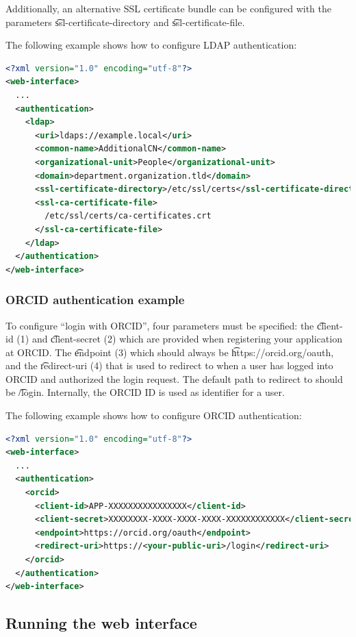   \begin{sloppypar}
  Additionally, an alternative SSL certificate bundle can be configured with
  the parameters \t{ssl-certificate-directory} and
  \t{ssl-certificate-file}.
  \end{sloppypar}

  The following example shows how to configure LDAP authentication:

\begin{lstlisting}[language=XML]
<?xml version="1.0" encoding="utf-8"?>
<web-interface>
  ...
  <authentication>
    <ldap>
      <uri>ldaps://example.local</uri>
      <common-name>AdditionalCN</common-name>
      <organizational-unit>People</organizational-unit>
      <domain>department.organization.tld</domain>
      <ssl-certificate-directory>/etc/ssl/certs</ssl-certificate-directory>
      <ssl-ca-certificate-file>
        /etc/ssl/certs/ca-certificates.crt
      </ssl-ca-certificate-file>
    </ldap>
  </authentication>
</web-interface>
\end{lstlisting}

\subsubsection{ORCID authentication example}

  To configure ``login with ORCID'', four parameters must be specified:
  the \t{client-id} (1) and \t{client-secret} (2) which are provided
  when registering your application at ORCID.  The \t{endpoint} (3) which
  should always be \t{https://orcid.org/oauth}, and the \t{redirect-uri}
  (4) that is used to redirect to when a user has logged into ORCID and
  authorized the login request.  The default path to redirect to should
  be \t{/login}.  Internally, the ORCID ID is used as identifier for a user.

  The following example shows how to configure ORCID authentication:

\begin{lstlisting}[language=XML]
<?xml version="1.0" encoding="utf-8"?>
<web-interface>
  ...
  <authentication>
    <orcid>
      <client-id>APP-XXXXXXXXXXXXXXXX</client-id>
      <client-secret>XXXXXXXX-XXXX-XXXX-XXXX-XXXXXXXXXXXX</client-secret>
      <endpoint>https://orcid.org/oauth</endpoint>
      <redirect-uri>https://<your-public-uri>/login</redirect-uri>
    </orcid>
  </authentication>
</web-interface>
\end{lstlisting}

\subsection{Running the web interface}

